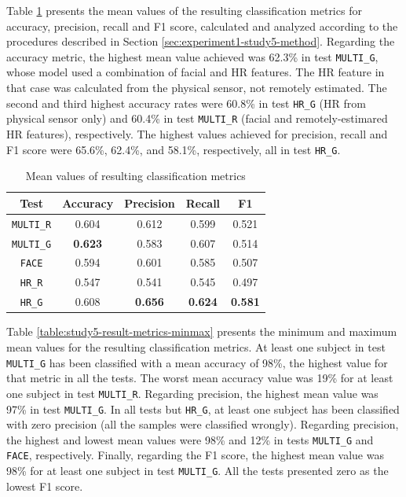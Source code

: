 Table \ref{table:study5-result-metrics-mean} presents the mean values of the resulting classification metrics for accuracy, precision, recall and F1 score, calculated and analyzed according to the procedures described in Section \ref{sec:experiment1-study5-method}. Regarding the accuracy metric, the highest mean value achieved was 62.3\% in test \texttt{MULTI\_G}, whose model used a combination of facial and HR features. The HR feature in that case was calculated from the physical sensor, not remotely estimated. The second and third highest accuracy rates were 60.8\% in test \texttt{HR\_G} (HR from physical sensor only) and 60.4\% in test \texttt{MULTI\_R} (facial and remotely-estimared HR features), respectively. The highest values achieved for precision, recall and F1 score were 65.6\%, 62.4\%, and 58.1\%, respectively, all in test \texttt{HR\_G}.

\begin{table}
    \centering
    \caption{Mean values of resulting classification metrics}
    \label{table:study5-result-metrics-mean}
    \begin{tabular}[l]{@{}ccccc}
        \toprule%
            \textbf{Test} & \textbf{Accuracy} & \textbf{Precision} & \textbf{Recall} & \textbf{F1}\\
        \midrule%
            \texttt{MULTI\_R} & 0.604 & 0.612 & 0.599 & 0.521 \\ %
            \texttt{MULTI\_G} & \textbf{0.623} & 0.583 & 0.607 & 0.514 \\ %
            \texttt{FACE} & 0.594 & 0.601 & 0.585 & 0.507 \\ %
            \texttt{HR\_R} & 0.547 & 0.541 & 0.545 & 0.497 \\ %
            \texttt{HR\_G} & 0.608 & \textbf{0.656} & \textbf{0.624} & \textbf{0.581} \\ %
        \bottomrule%
    \end{tabular}
\end{table}

Table \ref{table:study5-result-metrics-minmax} presents the minimum and maximum mean values for the resulting classification metrics. At least one subject in test \texttt{MULTI\_G} has been classified with a mean accuracy of 98\%, the highest value for that metric in all the tests. The worst mean accuracy value was 19\% for at least one subject in test \texttt{MULTI\_R}. Regarding precision, the highest mean value was 97\% in test \texttt{MULTI\_G}. In all tests but \texttt{HR\_G}, at least one subject has been classified with zero precision (all the samples were classified wrongly). Regarding precision, the highest and lowest mean values were 98\% and 12\% in tests \texttt{MULTI\_G} and \texttt{FACE}, respectively. Finally, regarding the F1 score, the highest mean value was 98\% for at least one subject in test \texttt{MULTI\_G}. All the tests presented zero as the lowest F1 score.

